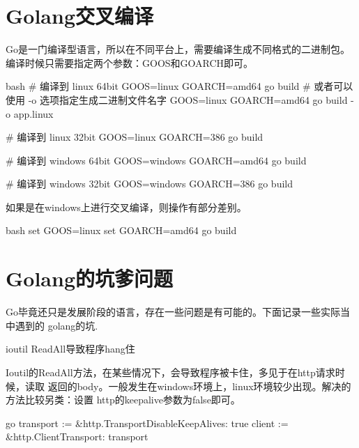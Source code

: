 \section{Golang交叉编译}
Go是一门编译型语言，所以在不同平台上，需要编译生成不同格式的二进制包。
编译时候只需要指定两个参数：GOOS和GOARCH即可。
\begin{code-block}{bash}
# 编译到 linux 64bit
GOOS=linux GOARCH=amd64 go build
# 或者可以使用 -o 选项指定生成二进制文件名字
GOOS=linux GOARCH=amd64 go build -o app.linux

# 编译到 linux 32bit
GOOS=linux GOARCH=386 go build

# 编译到 windows 64bit
GOOS=windows GOARCH=amd64 go build

# 编译到 windows 32bit
GOOS=windows GOARCH=386 go build
\end{code-block}

如果是在windows上进行交叉编译，则操作有部分差别。
\begin{code-block}{bash}
set GOOS=linux
set GOARCH=amd64
go build
\end{code-block}

\section{Golang的坑爹问题}
Go毕竟还只是发展阶段的语言，存在一些问题是有可能的。下面记录一些实际当中遇到的
golang的坑.
\begin{outline}[enumerate]

  \1 ioutil ReadAll导致程序hang住

  Ioutil的ReadAll方法，在某些情况下，会导致程序被卡住，多见于在http请求时候，读取
  返回的body。一般发生在windows环境上，linux环境较少出现。解决的方法比较另类：设置
  http的keepalive参数为false即可。
\begin{code-in-enumerate}{go}
transport := &http.Transport{DisableKeepAlives: true}
client := &http.Client{Transport: transport}
\end{code-in-enumerate}

\end{outline}
